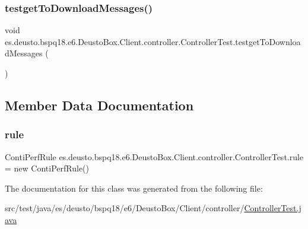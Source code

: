 \subsubsection{\texorpdfstring{testget\+To\+Download\+Messages()}{testgetToDownloadMessages()}}
{\footnotesize\ttfamily void es.\+deusto.\+bspq18.\+e6.\+Deusto\+Box.\+Client.\+controller.\+Controller\+Test.\+testget\+To\+Download\+Messages (\begin{DoxyParamCaption}{ }\end{DoxyParamCaption})}



\subsection{Member Data Documentation}
\mbox{\label{classes_1_1deusto_1_1bspq18_1_1e6_1_1_deusto_box_1_1_client_1_1controller_1_1_controller_test_a343cd51d4094a0451f62c2080d3383d8}} 
\subsubsection{\texorpdfstring{rule}{rule}}
{\footnotesize\ttfamily Conti\+Perf\+Rule es.\+deusto.\+bspq18.\+e6.\+Deusto\+Box.\+Client.\+controller.\+Controller\+Test.\+rule = new Conti\+Perf\+Rule()}



The documentation for this class was generated from the following file\+:\begin{DoxyCompactItemize}
\item 
src/test/java/es/deusto/bspq18/e6/\+Deusto\+Box/\+Client/controller/\mbox{\hyperlink{_controller_test_8java}{Controller\+Test.\+java}}\end{DoxyCompactItemize}
